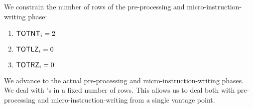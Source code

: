 \begin{center}
\end{center}
We constrain the number of rows of the pre-processing and micro-instruction-writing phase:
\begin{enumerate}
	\item $\textsf{TOTNT}_{i} = 2$
	\item $\textsf{TOTLZ}_{i} = 0$
	\item $\textsf{TOTRZ}_{i} = 0$
\end{enumerate}
We advance to the actual pre-processing and micro-instruction-writing phases.
We deal with \mmuInstMload{}'s in a fixed number of rows.
This allows us to deal both with pre-processing and micro-instruction-writing from a single vantage point. 

